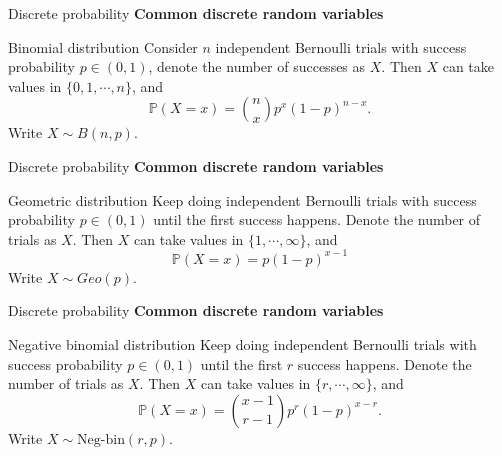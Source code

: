 \documentclass [aspectratio=169]{beamer}
\begin{document}
\begin{frame}{Discrete probability}
\textbf{Common discrete random variables}
\begin{block}{Binomial distribution}
Consider $n$ independent Bernoulli trials with success probability $p \in (0,1)$, denote the number of successes as $X$. Then $X$ can take values in $\{0, 1, \cdots, n\}$, and
$$
\mathbb{P}(X = x) = \binom{n}{x}p^x (1-p)^{n-x}.
$$
Write $X \sim B(n,p)$.
\end{block}
\vspace{0.1in}
\end{frame}


\begin{frame}{Discrete probability}
\textbf{Common discrete random variables}
\begin{block}{Geometric distribution}
Keep doing independent Bernoulli trials with success probability $p \in (0,1)$ until the first success happens. Denote the number of trials as $X$. Then $X$ can take values in $\{1, \cdots, \infty\}$, and
$$
\mathbb{P}(X = x) = p(1-p)^{x-1}
$$
Write $X \sim Geo(p)$.
\end{block}
\vspace{0.1in}
\end{frame}


\begin{frame}{Discrete probability}
\textbf{Common discrete random variables}
\begin{block}{Negative binomial distribution}
Keep doing independent Bernoulli trials with success probability $p \in (0,1)$ until the first $r$ success happens. Denote the number of trials as $X$. Then $X$ can take values in $\{r, \cdots, \infty\}$, and
$$
\mathbb{P}(X = x) = \binom{x-1}{r-1}p^{r}(1-p)^{x-r}.
$$
Write $X \sim \text{Neg-bin}(r,p)$.
\end{block}
\vspace{0.1in}
\end{frame}
\end{document}
